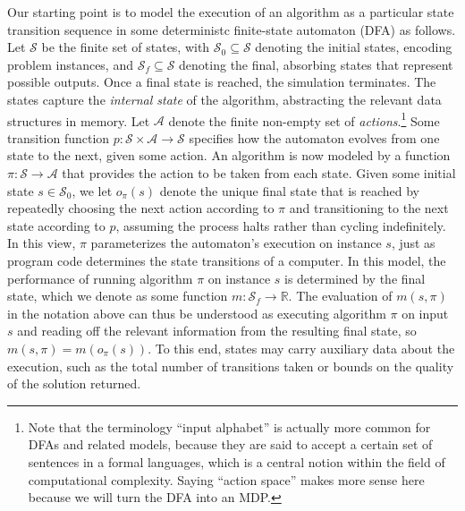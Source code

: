 \documentclass[a4paper]{report}
\theoremstyle{definition}
\theoremstyle{plain}
\begin{document}
Our starting point is to model the execution of an algorithm as a particular
state transition sequence in some deterministc finite-state automaton (DFA) as
follows. Let $\mathcal{S}$ be the finite set of states, with
$\mathcal{S}_0 \subseteq \mathcal{S}$ denoting the initial states, encoding problem
instances, and $\mathcal{S}_f \subseteq \mathcal{S}$ denoting the final, absorbing
states that represent possible outputs. Once a final state is reached, the
simulation terminates. The states capture the \emph{internal state} of the algorithm,
abstracting the relevant data structures in memory.
%
Let $\mathcal{A}$ denote the finite non-empty set of \emph{actions}.\footnote{Note that
  the terminology ``input alphabet'' is actually more common for DFAs and related
  models, because they are said to accept a certain set of sentences in a formal
  languages, which is a central notion within the field of computational
  complexity. Saying ``action space'' makes more sense here because we will turn
  the DFA into an MDP.}
%
Some transition function $p : \mathcal{S} \times \mathcal{A} \to \mathcal{S}$ specifies
how the automaton evolves from one state to the next, given some action.
%
An algorithm is now modeled by a function
$\pi : \mathcal{S} \rightarrow \mathcal{A}$ that provides the action to be taken
from each state.
%
Given some initial state $s \in \mathcal{S}_0$, we let $o_\pi(s)$ denote the
unique final state that is reached by repeatedly choosing the next action
according to $\pi$ and transitioning to the next state according to $p$, assuming
the process halts rather than cycling indefinitely. In this view, $\pi$
parameterizes the automaton’s execution on instance $s$, just as program code
determines the state transitions of a computer.
In this model, the performance of running algorithm $\pi$ on instance $s$ is
determined by the final state, which we denote as some function
$m : \mathcal{S}_f \rightarrow \mathbb{R}$.
%
The evaluation of $m(s,\pi)$ in the notation above can thus be understood as
executing algorithm $\pi$ on input $s$ and reading off the relevant information
from the resulting final state, so $m(s,\pi) = m(o_\pi(s))$. To this end, states
may carry auxiliary data about the execution, such as the total number of
transitions taken or bounds on the quality of the solution returned.
\end{document}
